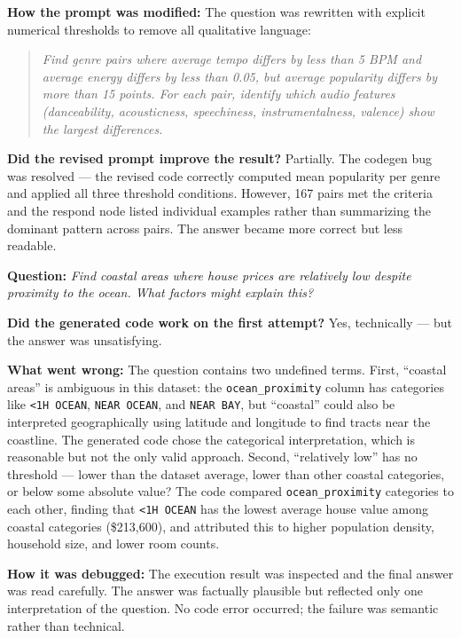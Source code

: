 \documentclass[12pt, oneside]{report}
\begin{document}
\textbf{How the prompt was modified:} The question was rewritten with explicit numerical thresholds to remove all qualitative language:

\begin{quote}
\textit{Find genre pairs where average tempo differs by less than 5 BPM and average energy differs by less than 0.05, but average popularity differs by more than 15 points. For each pair, identify which audio features (danceability, acousticness, speechiness, instrumentalness, valence) show the largest differences.}
\end{quote}

\textbf{Did the revised prompt improve the result?} Partially. The codegen bug was resolved --- the revised code correctly computed mean popularity per genre and applied all three threshold conditions. However, 167 pairs met the criteria and the respond node listed individual examples rather than summarizing the dominant pattern across pairs. The answer became more correct but less readable.


\textbf{Question:} \textit{Find coastal areas where house prices are relatively low despite proximity to the ocean. What factors might explain this?}

\textbf{Did the generated code work on the first attempt?} Yes, technically --- but the answer was unsatisfying.

\textbf{What went wrong:} The question contains two undefined terms. First, ``coastal areas'' is ambiguous in this dataset: the \texttt{ocean\_proximity} column has categories like \texttt{<1H OCEAN}, \texttt{NEAR OCEAN}, and \texttt{NEAR BAY}, but ``coastal'' could also be interpreted geographically using latitude and longitude to find tracts near the coastline. The generated code chose the categorical interpretation, which is reasonable but not the only valid approach. Second, ``relatively low'' has no threshold --- lower than the dataset average, lower than other coastal categories, or below some absolute value? The code compared \texttt{ocean\_proximity} categories to each other, finding that \texttt{<1H OCEAN} has the lowest average house value among coastal categories (\$213,600), and attributed this to higher population density, household size, and lower room counts.

\textbf{How it was debugged:} The execution result was inspected and the final answer was read carefully. The answer was factually plausible but reflected only one interpretation of the question. No code error occurred; the failure was semantic rather than technical.
\end{document}
